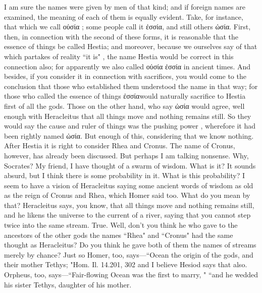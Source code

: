 \socratesspeaks
I am sure the names were given by men of that kind; and if foreign names are examined,  the meaning of each of them is equally evident. Take, for instance, that which we call οὐσία ; some people call it ἐσσία, and still others ὠσία. First, then, in connection with the second of these forms, it is reasonable that the essence of things be called Hestia; and moreover, because we ourselves say of that which partakes of reality ``it is" , the name Hestia would be correct in this connection also; for apparently we also called οὐσία  ἐσσία in ancient times. And besides, if you consider it in connection with sacrifices,  you would come to the conclusion that those who established them understood the name in that way; for those who called the essence of things ἐσσίαwould naturally sacrifice to Hestia first of all the gods. Those on the other hand, who say ὠσία would agree, well enough with Heracleitus that all things move and nothing remains still. So they would say the cause and ruler of things was the pushing power , wherefore it had been rightly named ὠσία. But enough of this, considering that we know nothing.  After Hestia it is right to consider Rhea and Cronus. The name of Cronus, however, has already been discussed. But perhaps I am talking nonsense.
\hermogenesspeaks
Why, Socrates?
\socratesspeaks
My friend, I have thought of a swarm of wisdom.
\hermogenesspeaks
What is it? 
\socratesspeaks
It sounds absurd, but I think there is some probability in it.
\hermogenesspeaks
What is this probability?
\socratesspeaks
I seem to have a vision of Heracleitus saying some ancient words of wisdom as old as the reign of Cronus and Rhea, which Homer said too.
\hermogenesspeaks
What do you mean by that?
\socratesspeaks
Heracleitus says, you know, that all things move and nothing remains still, and he likens the universe to the current of a river, saying that you cannot step twice into the same stream.
\hermogenesspeaks
True. 
\socratesspeaks
Well, don't you think he who gave to the ancestors of the other gods the names ``Rhea" and ``Cronus" had the same thought as Heracleitus? Do you think he gave both of them the names of streams merely by chance? Just so Homer, too, says—``Ocean the origin of the gods, and their mother Tethys;
"Hom. Il. 14.201, 302 and I believe Hesiod says that also. Orpheus, too, says—``Fair-flowing Ocean was the first to marry,
" 
``and he wedded his sister Tethys, daughter of his mother.

